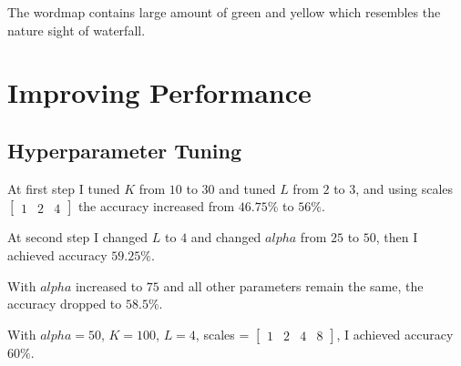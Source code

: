 \documentclass[11pt]{article} \usepackage{fullpage} \usepackage{graphicx} \usepackage{epstopdf} \usepackage{color} \usepackage{psfrag} \usepackage{pdfsync}\usepackage{indentfirst}\usepackage{subfigure}\usepackage{float}\usepackage[section]{placeins}
\begin{document}
The wordmap contains large amount of green and yellow which resembles the nature sight of waterfall.

\section{Improving Performance}
\setcounter{subsection}{0}
\subsection{Hyperparameter Tuning}

At first step I tuned $K$ from $10$ to $30$ and tuned $L$ from $2$ to $3$, and using scales $\left[ \begin{smallmatrix} 1 & 2 & 4 \end{smallmatrix} \right]$ the accuracy increased from $46.75\%$ to $56\%$.

At second step I changed $L$ to $4$ and changed $alpha$ from $25$ to $50$, then I achieved accuracy $59.25\%$.

With $alpha$ increased to $75$ and all other parameters remain the same, the accuracy dropped to $58.5\%$.

With $alpha = 50$, $K = 100$, $L = 4$, scales = $\left[ \begin{smallmatrix} 1 & 2 & 4 & 8 \end{smallmatrix} \right]$, I achieved accuracy $60\%$.
\end{document}
